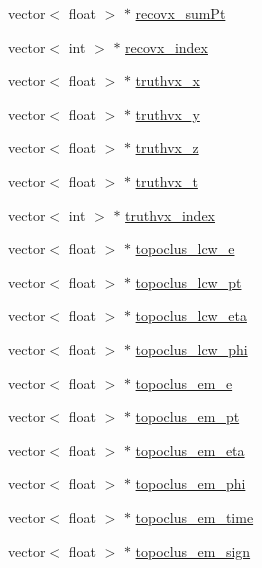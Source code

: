 \begin{DoxyCompactItemize}
\item 
vector$<$ float $>$ $\ast$ \hyperlink{classXMLWriter_a8ea6dbe8353df0a867be9e15c65fcffd}{recovx\+\_\+sum\+Pt}
\item 
vector$<$ int $>$ $\ast$ \hyperlink{classXMLWriter_a56ec53df77dff0e8af606caaa3e7d778}{recovx\+\_\+index}
\item 
vector$<$ float $>$ $\ast$ \hyperlink{classXMLWriter_a49135038b6743cc765a32bbb3ebd6b8b}{truthvx\+\_\+x}
\item 
vector$<$ float $>$ $\ast$ \hyperlink{classXMLWriter_a3d8d0bd849700b0dd78a61006e0eb7c5}{truthvx\+\_\+y}
\item 
vector$<$ float $>$ $\ast$ \hyperlink{classXMLWriter_a4969a5ebf7d0888b87a704c9106b2a9b}{truthvx\+\_\+z}
\item 
vector$<$ float $>$ $\ast$ \hyperlink{classXMLWriter_aadaa8006cdcdf0bf8a4b326355f1cb80}{truthvx\+\_\+t}
\item 
vector$<$ int $>$ $\ast$ \hyperlink{classXMLWriter_a81421218fb60cd9097637aaec3734625}{truthvx\+\_\+index}
\item 
vector$<$ float $>$ $\ast$ \hyperlink{classXMLWriter_a154a35f75f22276e240edbc896fa3a4b}{topoclus\+\_\+lcw\+\_\+e}
\item 
vector$<$ float $>$ $\ast$ \hyperlink{classXMLWriter_a51ed49085be1e142e8c9d9b103443f3a}{topoclus\+\_\+lcw\+\_\+pt}
\item 
vector$<$ float $>$ $\ast$ \hyperlink{classXMLWriter_ad26c788808f87fe66c09dc75b11f2173}{topoclus\+\_\+lcw\+\_\+eta}
\item 
vector$<$ float $>$ $\ast$ \hyperlink{classXMLWriter_a3e43cf30c1d757825dbc35f547b4000a}{topoclus\+\_\+lcw\+\_\+phi}
\item 
vector$<$ float $>$ $\ast$ \hyperlink{classXMLWriter_aaf55f8a37b4257192e1e8a5fda800067}{topoclus\+\_\+em\+\_\+e}
\item 
vector$<$ float $>$ $\ast$ \hyperlink{classXMLWriter_a6c8dfca19b1f4498a15c72a613184b22}{topoclus\+\_\+em\+\_\+pt}
\item 
vector$<$ float $>$ $\ast$ \hyperlink{classXMLWriter_afae4043e2a3b8fd75f458e8d153b7198}{topoclus\+\_\+em\+\_\+eta}
\item 
vector$<$ float $>$ $\ast$ \hyperlink{classXMLWriter_a4eead0c1218200de9ffc41df356249c7}{topoclus\+\_\+em\+\_\+phi}
\item 
vector$<$ float $>$ $\ast$ \hyperlink{classXMLWriter_a4c2e64fb60b6ff5d52e1ddd7e4daa7b7}{topoclus\+\_\+em\+\_\+time}
\item 
vector$<$ float $>$ $\ast$ \hyperlink{classXMLWriter_ad926371c55f546cb03cb7d45a4bfa15c}{topoclus\+\_\+em\+\_\+sign}

\end{DoxyCompactItemize}
